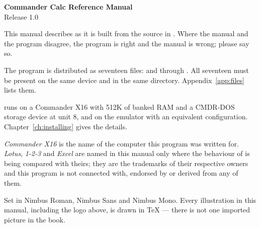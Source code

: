 \thispagestyle{empty}
\ccthumbfalse

\vspace*{\fill}

{\fontsize{9}{12.5}\selectfont

\textbf{Commander Calc Reference Manual}\\
Release 1.0

\vspace{10pt}

This manual describes \ccprod{} as it is built from the source in
. Where the manual and the program disagree, the program is
right and the manual is wrong; please say so.

\vspace{10pt}

The program is distributed as seventeen files:  and
 through . All seventeen must be present on the
same device and in the same directory. Appendix~\ref{app:files} lists them.

\vspace{10pt}

\ccprod{} runs on a Commander X16 with 512K of banked RAM and a CMDR-DOS
storage device at unit 8, and on the  emulator with an equivalent
configuration. Chapter~\ref{ch:installing} gives the details.

\vspace{16pt}

\textit{Commander X16} is the name of the computer this program was written
for. \textit{Lotus}, \textit{1-2-3} and \textit{Excel} are named in this manual
only where the behaviour of \ccprod{} is being compared with theirs; they are
the trademarks of their respective owners and this program is not connected
with, endorsed by or derived from any of them.

\vspace{16pt}

Set in Nimbus Roman, Nimbus Sans and Nimbus Mono. Every illustration in this
manual, including the logo above, is drawn in \TeX{} --- there is not one
imported picture in the book.

}

\vspace{22pt}

{\ccmark[0.42in]}

\vspace{0.35in}

\clearpage
